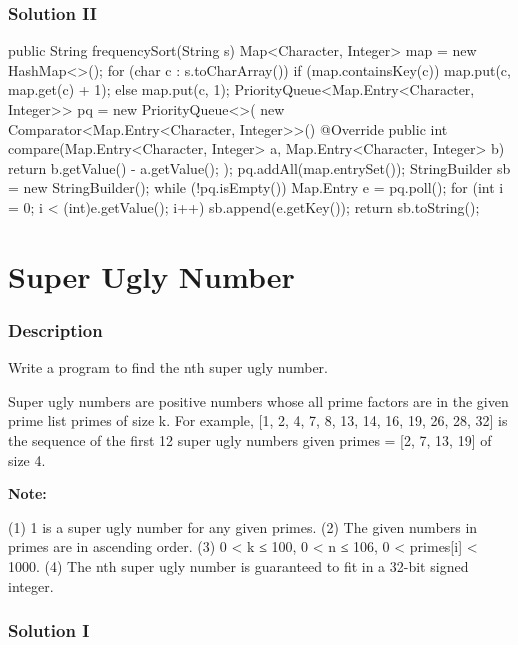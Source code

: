 \newpage
\subsubsection{Solution II}

\begin{Code}
public String frequencySort(String s) {
    Map<Character, Integer> map = new HashMap<>();
    for (char c : s.toCharArray()) {
        if (map.containsKey(c)) {
            map.put(c, map.get(c) + 1);
        } else {
            map.put(c, 1);
        }
    }
    PriorityQueue<Map.Entry<Character, Integer>> pq = new PriorityQueue<>(
            new Comparator<Map.Entry<Character, Integer>>() {
                @Override
                public int compare(Map.Entry<Character, Integer> a, Map.Entry<Character, Integer> b) {
                    return b.getValue() - a.getValue();
                }
            }
    );
    pq.addAll(map.entrySet());
    StringBuilder sb = new StringBuilder();
    while (!pq.isEmpty()) {
        Map.Entry e = pq.poll();
        for (int i = 0; i < (int)e.getValue(); i++) {
            sb.append(e.getKey());
        }
    }
    return sb.toString();
}
\end{Code}

\newpage


\section{Super Ugly Number} %

\subsubsection{Description}
Write a program to find the nth super ugly number.

Super ugly numbers are positive numbers whose all prime factors are in the given prime list primes of size k. For example, [1, 2, 4, 7, 8, 13, 14, 16, 19, 26, 28, 32] is the sequence of the first 12 super ugly numbers given primes = [2, 7, 13, 19] of size 4.

\textbf{Note:}
\begin{Code}
(1) 1 is a super ugly number for any given primes.
(2) The given numbers in primes are in ascending order.
(3) 0 < k ≤ 100, 0 < n ≤ 106, 0 < primes[i] < 1000.
(4) The nth super ugly number is guaranteed to fit in a 32-bit signed integer.
\end{Code}

\subsubsection{Solution I}


